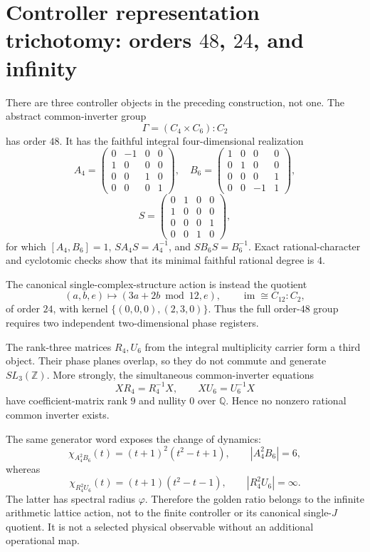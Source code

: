 \section*{Controller representation trichotomy: orders $48$, $24$, and infinity}

There are three controller objects in the preceding construction, not one.
The abstract common-inverter group
\[
 \Gamma=(C_4\times C_6):C_2
\]
has order $48$.  It has the faithful integral four-dimensional realization
\[
A_4=\begin{pmatrix}0&-1&0&0\\1&0&0&0\\0&0&1&0\\0&0&0&1\end{pmatrix},
\quad
B_6=\begin{pmatrix}1&0&0&0\\0&1&0&0\\0&0&0&1\\0&0&-1&1\end{pmatrix},
\]
\[
S=\begin{pmatrix}0&1&0&0\\1&0&0&0\\0&0&0&1\\0&0&1&0\end{pmatrix},
\]
for which $[A_4,B_6]=1$, $SA_4S=A_4^{-1}$, and
$SB_6S=B_6^{-1}$.  Exact rational-character and cyclotomic checks show that its
minimal faithful rational degree is $4$.

The canonical single-complex-structure action is instead the quotient
\[
 (a,b,e)\longmapsto(3a+2b\bmod 12,e),
 \qquad \operatorname{im}\cong C_{12}:C_2,
\]
of order $24$, with kernel
$\{(0,0,0),(2,3,0)\}$.  Thus the full order-$48$ group requires two independent
two-dimensional phase registers.

The rank-three matrices $R_4,U_6$ from the integral multiplicity carrier form a
third object.  Their phase planes overlap, so they do not commute and generate
$SL_3(\mathbb Z)$.  More strongly, the simultaneous common-inverter equations
\[
 XR_4=R_4^{-1}X,\qquad XU_6=U_6^{-1}X
\]
have coefficient-matrix rank $9$ and nullity $0$ over $\mathbb Q$.  Hence no
nonzero rational common inverter exists.

The same generator word exposes the change of dynamics:
\[
 \chi_{A_4^2B_6}(t)=(t+1)^2(t^2-t+1),\qquad |A_4^2B_6|=6,
\]
whereas
\[
 \chi_{R_4^2U_6}(t)=(t+1)(t^2-t-1),\qquad |R_4^2U_6|=\infty.
\]
The latter has spectral radius $\varphi$.  Therefore the golden ratio belongs
to the infinite arithmetic lattice action, not to the finite controller or its
canonical single-$J$ quotient.  It is not a selected physical observable
without an additional operational map.

